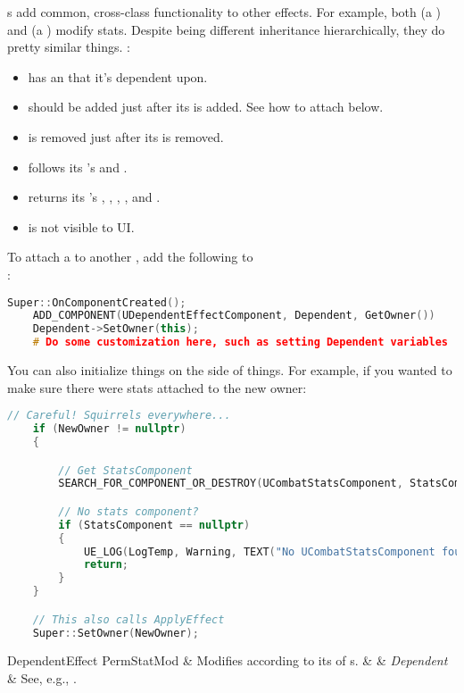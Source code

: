 



s add common, cross-class functionality to other effects. For example, both  (a ) and  (a ) modify stats. Despite being different inheritance hierarchically, they do pretty similar things. :
\begin{itemize}
	\item{has an  that it's dependent upon.}
	\item{should be added just after its  is added. See how to attach below.}
	\item{is removed just after its  is removed.}
	\item{follows its 's  and .}
	\item{returns its 's , , , , and .}
	\item{is not visible to UI.}
\end{itemize}
To attach a  to another , add the following to\\:
\begin{lstlisting}[language=c++]
	Super::OnComponentCreated();
	ADD_COMPONENT(UDependentEffectComponent, Dependent, GetOwner())
	Dependent->SetOwner(this);
	# Do some customization here, such as setting Dependent variables
\end{lstlisting}
You can also initialize things on the  side of things. For example, if you wanted to make sure there were stats attached to the new owner:
\begin{lstlisting}[language=c++]
	// Careful! Squirrels everywhere...
	if (NewOwner != nullptr)
	{

		// Get StatsComponent
		SEARCH_FOR_COMPONENT_OR_DESTROY(UCombatStatsComponent, StatsComponent, NewOwner->GetOwner(), true)

		// No stats component?
		if (StatsComponent == nullptr)
		{
			UE_LOG(LogTemp, Warning, TEXT("No UCombatStatsComponent found for PermStatMod! This is required *before* the Owner is set."))
			return;
		}
	}

	// This also calls ApplyEffect
	Super::SetOwner(NewOwner);
\end{lstlisting}

\newpage

\begin{EffectTable}{DependentEffect}
	PermStatMod	& {Modifies according to its  of s.}	&  & \textit{Dependent} & See, e.g., .\\
\end{EffectTable}


\postamble{}